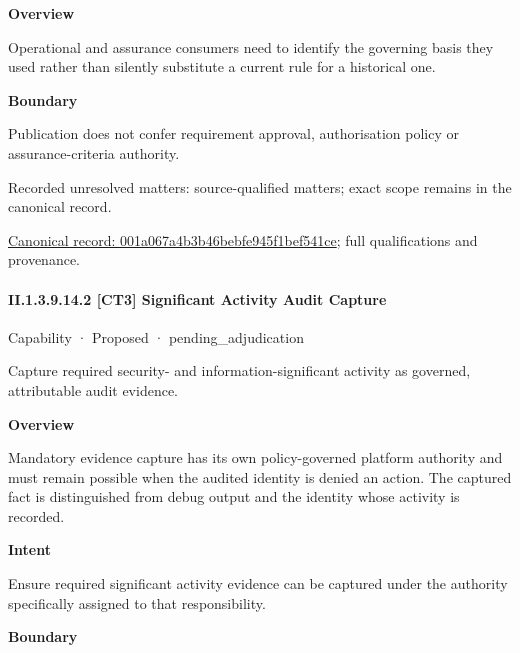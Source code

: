 \textbf{Overview}



Operational and assurance consumers need to identify the governing basis they used rather than silently substitute a current rule for a historical one.



\textbf{Boundary}



Publication does not confer requirement approval, authorisation policy or assurance-criteria authority.


{\small Recorded unresolved matters: source-qualified matters; exact scope remains in the canonical record.}\par
{\footnotesize \href{../../../../continuum/strategy/capability/feature/001a067a4b3b46bebfe945f1bef541ce.md}{Canonical record: 001a067a4b3b46bebfe945f1bef541ce}; full qualifications and provenance.}\par
\paragraph*{II.1.3.9.14.2 [CT3] Significant Activity Audit Capture}
\label{navigation:II.1.3.9.14.2}

\label{element:d903948169eb4785b0f03d916c842a8a}
{\small Capability · Proposed · pending\_adjudication}\par

Capture required security- and information-significant activity as governed, attributable audit evidence.



\textbf{Overview}



Mandatory evidence capture has its own policy-governed platform authority and must remain possible when the audited identity is denied an action. The captured fact is distinguished from debug output and the identity whose activity is recorded.



\textbf{Intent}



Ensure required significant activity evidence can be captured under the authority specifically assigned to that responsibility.



\textbf{Boundary}



